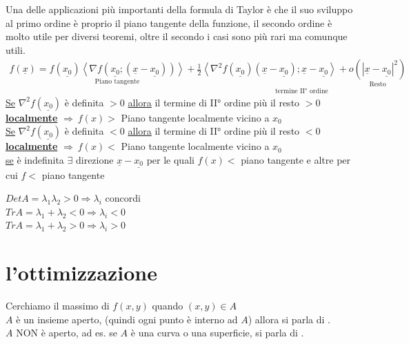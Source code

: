 \documentclass[a4paper, oneside]{article}
\begin{document}
        \begin{proposition}
        Una delle applicazioni più importanti della formula di Taylor è che il suo sviluppo al primo ordine è proprio il piano tangente della funzione, il secondo ordine è molto utile per diversi teoremi, oltre il secondo i casi sono più rari ma comunque utili.
            \begin{gather*}
                f(\underline{x}) = \underset{\text{Piano tangente}}{f(\underline{x_0}) \left\langle \nabla f(\underline{x_0};(\underline{x} - \underline{x_0})) \right\rangle} + \underset{\text{termine II° ordine}}{\frac{1}{2} \left\langle \nabla^2 f(\underline{x_0})(\underline{x}- \underline{x_0}); \underline{x}- \underline{x_0}\right\rangle  + \underset{\text{Resto}}{o(| \underline{x}- \underline{x_0} |^2)}}
            \end{gather*}
            \underline{Se} $\nabla^2f(\underline{x_0})$ è definita $> 0$ \underline{allora} il termine di II° ordine più il resto $>0$ \underline{\textbf{localmente}} $\Rightarrow \ f(x) > $ Piano tangente localmente vicino a $x_0$\\
            \underline{Se} $\nabla^2f(\underline{x_0})$ è definita $< 0$ \underline{allora} il termine di II° ordine più il resto $<0$ \underline{\textbf{localmente}} $\Rightarrow \ f(x) < $ Piano tangente localmente vicino a $x_0$\\ 
            \underline{se} è indefinita $\exists $ direzione $\underline{x} - \underline{x_0}$ per le quali $f(x) < $ piano tangente e altre per cui $f < $ piano tangente\\
        \end{proposition}


        \begin{proposition}
            $Det A = \lambda_1 \lambda_2 > 0 \Rightarrow \lambda_i$ concordi\\
            $Tr A = \lambda_1 + \lambda_2 < 0 \Rightarrow \lambda_i< 0$\\
            $Tr A = \lambda_1 + \lambda_2 > 0 \Rightarrow \lambda_i> 0$\\ 
        \end{proposition}





        \section{l'ottimizzazione}
        Cerchiamo il massimo di $f(x,y)$ quando $(x,y) \in A$\\
         $A$ è un insieme aperto, (quindi ogni punto è interno ad $A$) allora si parla di .\\
         $A$ NON è aperto, ad es. se $A$ è una curva o una superficie, si parla di .\\
\end{document}
